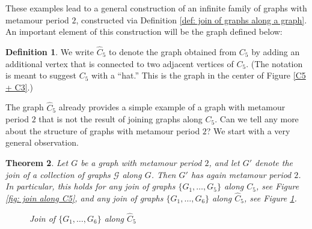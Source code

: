 \documentclass[12pt]{amsart}
\newtheorem{theorem}{Theorem}[section]
\theoremstyle{definition}
\newtheorem{definition}[theorem]{Definition}
\theoremstyle{remark}
\numberwithin{equation}{section}
\numberwithin{figure}{section}
\begin{document}
These examples lead to a general construction of an infinite family of graphs with metamour period $2$, constructed via Definition \ref{def: join of graphs along a graph}.
An important element of this construction will be the graph defined below: 

\begin{definition}
\label{def:Chat}
    We write $\widehat{C}_5$ to denote the graph obtained from $C_5$ by adding an additional vertex that is connected to two adjacent vertices of $C_5$.  (The notation is meant to suggest $C_5$ with a ``hat.''
    This is the graph in the center of Figure \ref{C5 + C3}.)
\end{definition}

The graph $\widehat{C}_5$ already provides a simple example of a graph with metamour period $2$ that is not the result of joining graphs along $C_5$. Can we tell any more about the structure of graphs with metamour period $2$? We start with a very general observation.

\begin{theorem} \label{thm:genconstr}
    Let $G$ be a graph with metamour period $2$, and let $G'$ denote the join of a collection of graphs $\mathcal{G}$ along $G$. Then $G'$ has again metamour period $2$.
    In particular, this holds for any join of graphs $\{G_1, \ldots, G_5\}$ along $C_5$, see Figure \ref{fig: join along C5}, and any join of graphs $\{G_1, \ldots, G_6\}$ along $\widehat{C}_5$, see Figure \ref{C_5 party hat with arbitrary graphs}.
    \begin{figure}[h!]
        \centering
    \caption{Join of $\{G_1, \ldots, G_6\}$ along $\widehat{C}_5$}
    \label{C_5 party hat with arbitrary graphs}
    \end{figure}
\end{theorem}
\end{document}
